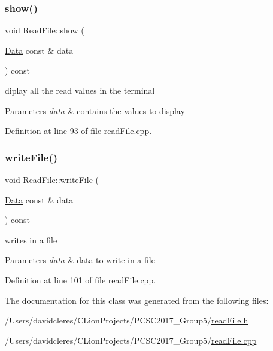 \subsubsection{\texorpdfstring{show()}{show()}}
{\footnotesize\ttfamily void Read\+File\+::show (\begin{DoxyParamCaption}\item[{\mbox{\hyperlink{struct_data}{Data}} const \&}]{data }\end{DoxyParamCaption}) const}



diplay all the read values in the terminal 


\begin{DoxyParams}{Parameters}
{\em data} & contains the values to display \\
\hline
\end{DoxyParams}


Definition at line 93 of file read\+File.\+cpp.

\mbox{\label{class_read_file_ab66909fd861779f01fde0e11aef0b77b}} 
\subsubsection{\texorpdfstring{write\+File()}{writeFile()}}
{\footnotesize\ttfamily void Read\+File\+::write\+File (\begin{DoxyParamCaption}\item[{\mbox{\hyperlink{struct_data}{Data}} const \&}]{data }\end{DoxyParamCaption}) const}



writes in a file 


\begin{DoxyParams}{Parameters}
{\em data} & data to write in a file \\
\hline
\end{DoxyParams}


Definition at line 101 of file read\+File.\+cpp.



The documentation for this class was generated from the following files\+:\begin{DoxyCompactItemize}
\item 
/\+Users/davidcleres/\+C\+Lion\+Projects/\+P\+C\+S\+C2017\+\_\+\+Group5/\mbox{\hyperlink{read_file_8h}{read\+File.\+h}}\item 
/\+Users/davidcleres/\+C\+Lion\+Projects/\+P\+C\+S\+C2017\+\_\+\+Group5/\mbox{\hyperlink{read_file_8cpp}{read\+File.\+cpp}}\end{DoxyCompactItemize}
